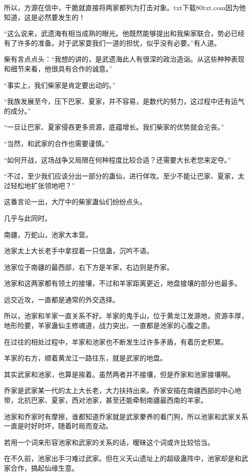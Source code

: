 \begin{this_body}
所以，方源在信中，干脆就直接将两家都列为打击对象。txt下载80txt.com因为他知道，这是必然要发生的！

“这么说来，武遗海有相当成熟的眼光。他既然能够提出和我柴家联合，势必已经有了许多的准备。对于武家耍我们一道的担忧，似乎没有必要。”有人道。

柴有言点点头：“我想的讲的，是武遗海此人有很深的政治造诣。从这些种种表现和细节来看，他很具有合作的诚意。”

“事实上，我们柴家是肯定要出动的。”

“我族发展至今，压下巴家、夏家，并不容易，是数代的努力，这过程中还有运气的成分。”

“一旦让巴家、夏家侵吞更多资源，底蕴增长。我们柴家的优势就会沦丧。”

“当然，和武家的合作也需要谨慎。”

“如何开战，这场战争又局限在何种程度比较合适？还需要大长老您来定夺。”

“不过，至少我们应该分出一部分的蛊仙，进行佯攻。至少不能让巴家、夏家，太过轻松地扩张领地吧？”

这番言论一出，大厅中的柴家蛊仙们纷纷点头。

几乎与此同时。

南疆，万蛇山，池家大本营。

池家太上大长老手中拿捏着一只信蛊，沉吟不语。

池家位于南疆的最西部，右下方是羊家，右边则是乔家。

池家和这两家都有领土的接壤，不过和羊家距离更近，地盘接壤的部分也最多。

远交近攻，一直都是通常的外交选择。

所以，池家和羊家一直关系不好。羊家的鬼手山，位于黄龙江发源地，资源丰厚，地形险要，羊家蛊仙主修魂道，战力突出，一直都是池家的心腹之患。

在过往的相处过程中，羊家和池家也不断发生过许多矛盾，有着历史积累。

羊家的右方，顺着黄龙江一路往东，就是武家的地盘。

其实武家和池家，也算是挨着。虽然两者并不接壤，但是乔家和池家接壤啊。

乔家是武家某一代的太上大长老，大力扶持出来。乔家安插在南疆西部的中心地带，北抗巴家、夏家，西对池家，甚至还能牵制南疆最西南的羊家。

池家和乔家时有摩擦，谁都知道乔家就是武家豢养的看门狗，所以池家和武家关系一直是时好时坏，随着时局而变动。

若用一个词来形容池家和武家的关系的话，暧昧这个词或许比较恰当。

在不久前，池家出手刁难过武家。但在义天山遗址上的超级蛊阵中，池家却是和武家合作，搞起仙缘生意。


\end{this_body}
